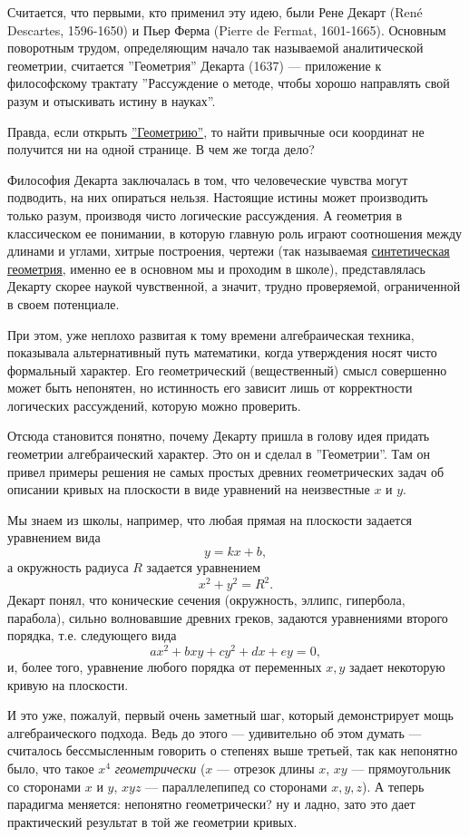 \documentclass[a4paper,12pt]{article}
\newcounter{z-counter}
\newcounter{th-counter}
\begin{document}
Считается, что первыми, кто применил эту идею, были Рене Декарт (René Descartes, 1596-1650) и Пьер Ферма (Pierre de Fermat, 1601-1665). Основным поворотным трудом, определяющим начало так называемой аналитической геометрии, считается ''Геометрия'' Декарта (1637) --- приложение к философскому трактату ''Рассуждение о методе, чтобы хорошо направлять свой разум и отыскивать истину в науках''.

Правда, если открыть \href{https://archive.org/details/dekart_geometrija/mode/2up}{''Геометрию''}, то найти привычные оси координат не получится ни на одной странице. В чем же тогда дело? 

Философия Декарта заключалась в том, что человеческие чувства могут подводить, на них опираться нельзя. Настоящие истины может производить только разум, производя чисто логические рассуждения. А геометрия в классическом ее понимании, в которую главную роль играют соотношения между длинами и углами, хитрые построения, чертежи (так называемая \href{https://en.wikipedia.org/wiki/Synthetic_geometry}{синтетическая геометрия}, именно ее в основном мы и проходим в школе), представлялась Декарту скорее наукой чувственной, а значит, трудно проверяемой, ограниченной в своем потенциале.

При этом, уже неплохо развитая к тому времени алгебраическая техника, показывала альтернативный путь математики, когда утверждения носят чисто формальный характер. Его геометрический (вещественный) смысл совершенно может быть непонятен, но истинность его зависит лишь от корректности логических рассуждений, которую можно проверить.

Отсюда становится понятно, почему Декарту пришла в голову идея придать геометрии алгебраический характер. Это он и сделал в ''Геометрии''. Там он привел примеры решения не самых простых древних геометрических задач об описании кривых на плоскости в виде уравнений на неизвестные $x$ и $y$.

Мы знаем из школы, например, что любая прямая на плоскости задается уравнением вида
\[
y = kx +b,
\]
а окружность радиуса $R$ задается уравнением
\[
x^2 + y^2 = R^2.
\]
Декарт понял, что конические сечения (окружность, эллипс, гипербола, парабола), сильно волновавшие древних греков, задаются уравнениями второго порядка, т.е. следующего вида
\[
ax^2 +bxy + cy^2 + dx + ey = 0,
\]
и, более того, уравнение любого порядка от переменных $x,y$ задает некоторую кривую на плоскости. 

И это уже, пожалуй, первый очень заметный шаг, который демонстрирует мощь алгебраического подхода. Ведь до этого --- удивительно об этом думать --- считалось бессмысленным говорить о степенях выше третьей, так как непонятно было, что такое $x^4$ \textit{геометрически} ($x$ --- отрезок длины $x$, $xy$ --- прямоугольник со сторонами $x$ и $y$, $xyz$ --- параллелепипед со сторонами $x, y, z$). А теперь парадигма меняется: непонятно геометрически? ну и ладно, зато это дает практический результат в той же геометрии кривых.
\end{document}
